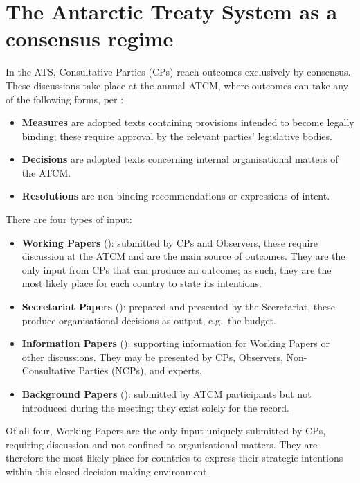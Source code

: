 \section{The Antarctic Treaty System as a consensus regime}
\label{sec:ats}
In the ATS, Consultative Parties (CPs) reach outcomes exclusively by consensus. 
These discussions take place at the annual ATCM, where outcomes can take any of the following forms,
 per \textcite[Rule~24]{ATS2023RoP}:
\begin{itemize}
\item \textbf{Measures} are adopted texts containing provisions intended to become legally binding;
 these require approval by the relevant parties' legislative bodies.
\item \textbf{Decisions} are adopted texts concerning internal organisational matters of the ATCM.
\item \textbf{Resolutions} are non-binding recommendations or expressions of intent.
\end{itemize}

There are four types of input:
\begin{itemize}
\item \textbf{Working Papers} (\textcite[Rule~48]{ATS2023RoP}): submitted by CPs and Observers, these require
 discussion at the ATCM and are the main source of outcomes. They are the only input from CPs that can produce
  an outcome; as such, they are the most likely place for each country to state its intentions.
\item \textbf{Secretariat Papers} (\textcite[Rule~49]{ATS2023RoP}): prepared and presented by the Secretariat,
 these produce organisational decisions as output, e.g.\ the budget.
\item \textbf{Information Papers} (\textcite[Rule~50]{ATS2023RoP}): supporting information for Working Papers
 or other discussions. They may be presented by CPs, Observers, Non-Consultative Parties (NCPs), and experts.
\item \textbf{Background Papers} (\textcite[Rule~51]{ATS2023RoP}): submitted by ATCM participants but not 
introduced during the meeting; they exist solely for the record.
\end{itemize}

Of all four, Working Papers are the only input uniquely submitted by CPs, requiring discussion and not confined
 to organisational matters. They are therefore the most likely place for countries to express their strategic 
 intentions within this closed decision-making environment.

